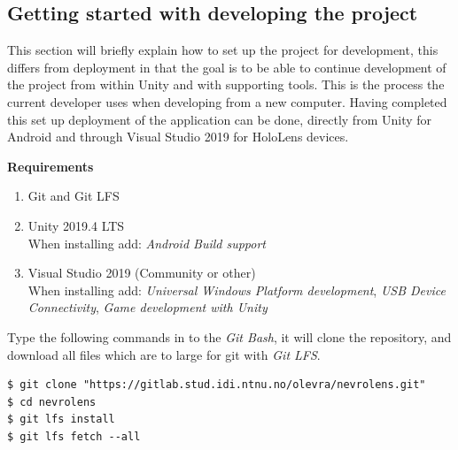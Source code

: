 \subsection*{Getting started with developing the project}
This section will briefly explain how to set up the project for development, this differs from deployment in that the goal is to be able to continue development of the project from within Unity and with supporting tools. This is the process the current developer uses when developing from a new computer.
Having completed this set up deployment of the application can be done, directly from Unity for Android and through Visual Studio 2019 for HoloLens devices.


\textbf{Requirements}
\begin{enumerate}
    \item Git and Git LFS
    \item { Unity 2019.4 LTS \\
    When installing add: \textit{Android Build support} }
    \item {Visual Studio 2019 (Community or other)\\
    When installing add: \textit{Universal Windows Platform development}, \textit{USB Device Connectivity}, \textit{Game development with Unity} }
\end{enumerate}

Type the following commands in to the \textit{Git Bash}, it will clone the repository, and download all files which are to large for git with \textit{Git LFS}.
\begin{lstlisting}[numbers=none]
$ git clone "https://gitlab.stud.idi.ntnu.no/olevra/nevrolens.git"
$ cd nevrolens
$ git lfs install
$ git lfs fetch --all
\end{lstlisting}

